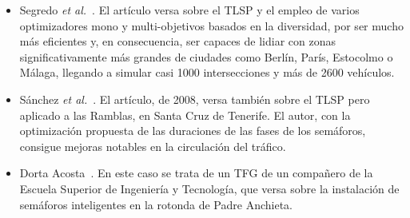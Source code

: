 \begin{itemize}
    \item Segredo \textit{et al.}~\cite{segredo_optimising_2019}. El artículo versa sobre el TLSP y el empleo de varios optimizadores mono y multi-objetivos basados en la diversidad, por ser mucho más eficientes y, en consecuencia, ser capaces de lidiar con zonas significativamente más grandes de ciudades como Berlín, París, Estocolmo o Málaga, llegando a simular casi 1000 intersecciones y más de 2600 vehículos.
    \item Sánchez \textit{et al.}~\cite{sanchez_applying_2008}. El artículo, de 2008, versa también sobre el TLSP pero aplicado a las Ramblas, en Santa Cruz de Tenerife. El autor, con la optimización propuesta de las duraciones de las fases de los semáforos, consigue mejoras notables en la circulación del tráfico.
    \item Dorta Acosta~\cite{dorta_acosta_simulacion_2019}. En este caso se trata de un TFG de un compañero de la Escuela Superior de Ingeniería y Tecnología, que versa sobre la instalación de semáforos inteligentes en la rotonda de Padre Anchieta.
\end{itemize}

